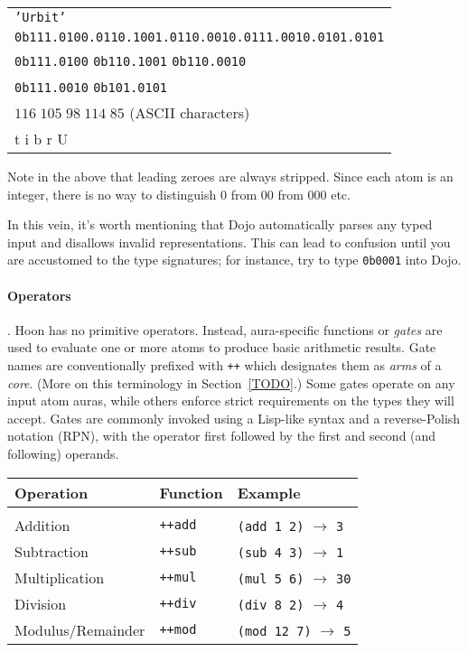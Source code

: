 \begin{tabular}{l}
  \texttt{'Urbit'} \\
  \texttt{0b111.0100.0110.1001.0110.0010.0111.0010.0101.0101} \\
  \texttt{0b111.0100} \texttt{0b110.1001} \texttt{0b110.0010} \\ \texttt{0b111.0010} \texttt{0b101.0101} \\
  $116\;105\;98\;114\;85$ (ASCII characters) \\
  t i b r U
\end{tabular}

Note in the above that leading zeroes are always stripped.  Since each atom is an integer, there is no way to distinguish $0$ from $00$ from $000$ etc.

In this vein, it's worth mentioning that Dojo automatically parses any typed input and disallows invalid representations.  This can lead to confusion until you are accustomed to the type signatures; for instance, try to type \texttt{0b0001} into Dojo.

\paragraph{Operators}.  Hoon has no primitive operators.  Instead, aura-specific functions or \emph{gates} are used to evaluate one or more atoms to produce basic arithmetic results.  Gate names are conventionally prefixed with \texttt{++} which designates them as \emph{arms} of a \emph{core}.  (More on this terminology in Section~\ref{TODO}.)  Some gates operate on any input atom auras, while others enforce strict requirements on the types they will accept.  Gates are commonly invoked using a Lisp-like syntax and a reverse-Polish notation (RPN), with the operator first followed by the first and second (and following) operands.

\begin{tabular}{lll}
  Operation & Function & Example \\ \hline \\
  Addition & \texttt{++add} & \texttt{(add 1 2)} $\rightarrow$ \texttt{3} \\
  Subtraction & \texttt{++sub} & \texttt{(sub 4 3)} $\rightarrow$ \texttt{1} \\
  Multiplication & \texttt{++mul} & \texttt{(mul 5 6)} $\rightarrow$ \texttt{30} \\
  Division & \texttt{++div} & \texttt{(div 8 2)} $\rightarrow$ \texttt{4} \\
  Modulus/Remainder & \texttt{++mod} & \texttt{(mod 12 7)} $\rightarrow$ \texttt{5} \\
\end{tabular}

